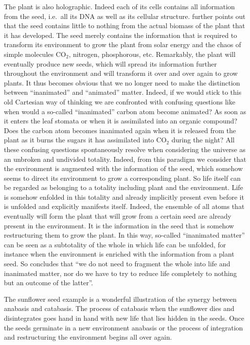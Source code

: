\documentclass[
  11pt,
]{book}
\begin{document}
The plant is also holographic. Indeed each of its cells contains all information from the seed, i.e.~all its DNA as well as its cellular structure. \citet{bohm1980} further points out that the seed contains little to nothing from the actual biomass of the plant that it has developed. The seed merely contains the information that is required to transform its environment to grow the plant from solar energy and the chaos of simple molecules CO\(_2\), nitrogen, phosphorous, etc. Remarkably, the plant will eventually produce new seeds, which will spread its information further throughout the environment and will transform it over and over again to grow plants. It thus becomes obvious that we no longer need to make the distinction between ``inanimated'' and ``animated'' matter. Indeed, if we would stick to this old Cartesian way of thinking we are confronted with confusing questions like when would a so-called ``inanimated'' carbon atom become animated? As soon as it enters the leaf stomata or when it is assimilated into an organic compound? Does the carbon atom becomes inanimated again when it is released from the plant as it burns the sugars it has assimilated into CO\(_2\) during the night? All these confusing questions spontaneously resolve when considering the universe as an unbroken and undivided totality. Indeed, from this paradigm we consider that the environment is augmented with the information of the seed, which somehow seems to direct its environment to grow a corresponding plant. So life itself can be regarded as belonging to a totality including plant and the environment. Life is somehow enfolded in this totality and already implicitly present even before it is unfolded and explicitly manifests itself. Indeed, the ensemble of all atoms that eventually will form the plant that will grow from a certain seed are already present in the environment. It is the information in the seed that is somehow restructuring them to grow the plant. In this way, so-called ``inanimated matter'' can be seen as a subtotality of the whole in which life can be unfolded, for instance when the environment is enriched with the information from a plant seed. So \citet{bohm1980} concludes that ``we do not need to fragment the whole into life and inanimated matter, nor do we have to try to reduce life completely to nothing but an outcome of the latter''.

The sunflower seed example is a wonderful illustration of the synergy between anabasis and catabasis. The process of catabasis when the sunflower dies and disintegrates goes hand in hand with new life that lies hidden in the seeds. Once the seeds germinate in a new environment anabasis or the process of integration and restructuring the environment begins all over again.
\end{document}

